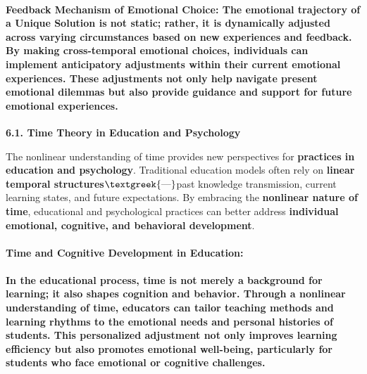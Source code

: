 \documentclass[a4paper]{article}
\begin{document}
\paragraph[Feedback Mechanism of Emotional Choice: The emotional trajectory of a Unique Solution is not static; rather,
it is dynamically adjusted across varying circumstances based on new experiences and feedback. By making
cross{}-temporal emotional choices, individuals can implement anticipatory adjustments within their current emotional
experiences. These adjustments not only help navigate present emotional dilemmas but also provide guidance and support
for future emotional experiences.]{\textbf{Feedback Mechanism of Emotional Choice: }The emotional trajectory of a
Unique Solution is not static; rather, it is \textbf{dynamically adjusted} across varying circumstances based on
\textbf{new experiences and feedback}. By making cross-temporal emotional choices, individuals can implement
\textbf{anticipatory adjustments} within their current emotional experiences. These adjustments not only help navigate
present emotional dilemmas but also provide \textbf{guidance and support} for future emotional experiences.}
\textbf{6.1. Time Theory in Education and Psychology}

The nonlinear understanding of time provides new perspectives for \textbf{practices in education and psychology}.
Traditional education models often rely on \textbf{linear temporal structures}$\text{\textgreek{—}}$past knowledge
transmission, current learning states, and future expectations. By embracing the \textbf{nonlinear nature of time},
educational and psychological practices can better address \textbf{individual emotional, cognitive, and behavioral
development}.

\paragraph[Time and Cognitive Development in Education:]{\textbf{Time and Cognitive Development in Education:}}
\paragraph[In the educational process, time is not merely a background for learning; it also shapes cognition and
behavior. Through a nonlinear understanding of time, educators can tailor teaching methods and learning rhythms to the
emotional needs and personal histories of students. This personalized adjustment not only improves learning efficiency
but also promotes emotional well{}-being, particularly for students who face emotional or cognitive challenges.]{In the
educational process, time is not merely a background for learning; it also \textbf{shapes cognition and behavior}.
Through a nonlinear understanding of time, educators can tailor \textbf{teaching methods and learning rhythms} to the
emotional needs and personal histories of students. This personalized adjustment not only improves learning efficiency
but also \textbf{promotes emotional well-being}, particularly for students who face emotional or cognitive challenges.}
\end{document}
